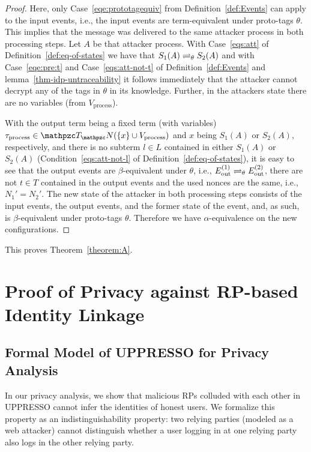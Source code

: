 \begin{proof}
    Here, only Case~\ref{eqe:prototagequiv} from
    Definition~\ref{def:Events} can apply to the input events,
    i.e., the input events are term-equivalent under proto-tags
    $\theta$. This implies that the message was delivered to the 
    same attacker process in both processing steps. Let $A$ be 
    that attacker process. With Case~\ref{eqs:att} of 
    Definition~\ref{def:eq-of-states} we have that 
    $S_1(A) \rightleftharpoons_{\theta} S_2(A)$ and with 
    Case~\ref{eqe:pre:t} and Case~\ref{eqs:att-not-t} of 
    Definition~\ref{def:Events} and 
    lemma~\ref{thm-idp-untraceability} 
    it follows immediately that the 
    attacker cannot decrypt any of the tags in $\theta$ in its 
    knowledge. Further, in the attackers state there are no 
    variables (from $V_\text{process}$). 
  
    With the output term being a fixed term (with variables)
    $\tau_{\text{process}} \in \terms(\{x\} \cup V_\text{process})$ 
    and $x$ being $S_1(A)$ or $S_2(A)$, respectively, and there 
    is no subterm $l \in L$ contained in either $S_1(A)$ or 
    $S_2(A)$ (Condition~\ref{eqs:att-not-l} of 
    Definition~\ref{def:eq-of-states}), it is easy to see that 
    the output events are $\beta$-equivalent under $\theta$, i.e., 
    $E ^{(1)}_\text{out} \rightleftharpoons_{\theta} E^{(2)}_\text{out}$, there
    are not $t \in T$ contained in the output events and the 
    used nonces are the same, i.e., $N_1' = N_2'$. The new state 
    of the attacker in both processing steps consists of the 
    input events, the output events, and the former state of the 
    event, and, as such, is $\beta$-equivalent under proto-tags 
    $\theta$. Therefore we have $\alpha$-equivalence on the
    new configurations.
  \end{proof}
  
  This proves Theorem~\ref{theorem:A}.\QED
  
  \section{Proof of Privacy against RP-based Identity Linkage}
  
  \subsection{Formal Model of UPPRESSO for Privacy Analysis}
  
  In our privacy analysis, we show that malicious RPs colluded 
  with each other in UPPRESSO cannot infer the identities of 
  honest users. We formalize this property as an 
  indistinguishability property: two relying parties (modeled as 
  a web attacker) cannot distinguish whether a user logging in 
  at one relying party also logs in the other relying party.
  
